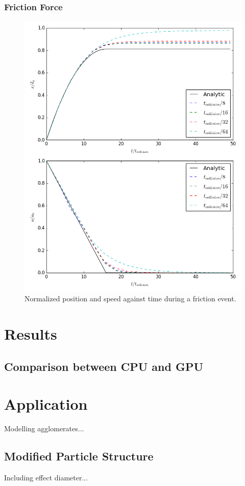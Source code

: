 \documentclass[10pt,a4paper,titlepage]{report}
\begin{document}
\subsection{Friction Force}
\begin{figure}[!htb]
\centering
\includegraphics[scale=0.75]{figures/friction_verification.png}
\caption{Normalized position and speed against time during a friction event.}
\label{fig:friction_verification}
\end{figure}
\chapter{Results}
\section{Comparison between CPU and GPU}
\chapter{Application}
Modelling agglomerates...
\section{Modified Particle Structure}
Including effect diameter...
\end{document}
